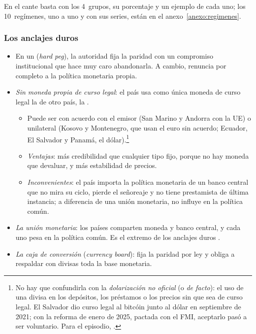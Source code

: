\documentclass[11pt]{article}
\begin{document}
\begin{notaopositor}
En el cante basta con los 4~grupos, su porcentaje y un ejemplo de cada uno; los 10~regímenes, uno a uno y con sus series, están en el anexo~\ref{anexo:regimenes}.
\end{notaopositor}

\subsubsection{Los anclajes duros}\label{sec:anclajes-duros}

\begin{itemize}
\item En un  (\emph{hard peg}), la autoridad fija la paridad con un compromiso institucional que hace muy caro abandonarla. A cambio, renuncia por completo a la política monetaria propia.
\item \emph{Sin moneda propia de curso legal}: el país usa como única moneda de curso legal la de otro país, la .
  \begin{itemize}
  \item Puede ser con acuerdo con el emisor (San Marino y Andorra con la UE) o unilateral (Kosovo y Montenegro, que usan el euro sin acuerdo; Ecuador, El Salvador y Panamá, el dólar).\footnote{No hay que confundirla con la \emph{dolarización no oficial} (o \emph{de facto}): el uso de una divisa en los depósitos, los préstamos o los precios sin que sea de curso legal. El Salvador dio curso legal al bitcóin junto al dólar en septiembre de 2021; con la reforma de enero de 2025, pactada con el FMI, aceptarlo pasó a ser voluntario\nocite{FMI2024ElSalvadorSLA,FMI2025ElSalvador}. Para el episodio, \textcite{Funcas2022ODF77}.}
  \item \emph{Ventajas}: más credibilidad que cualquier tipo fijo, porque no hay moneda que devaluar, y más estabilidad de precios.
  \item \emph{Inconvenientes}: el país importa la política monetaria de un banco central que no mira su ciclo, pierde el señoreaje y no tiene prestamista de última instancia; a diferencia de una unión monetaria, no influye en la política común.
  \end{itemize}
\item \emph{La unión monetaria}: los países comparten moneda y banco central, y cada uno pesa en la política común. Es el extremo de los anclajes duros .
\item \emph{La caja de conversión} (\emph{currency board}): fija la paridad por ley y obliga a respaldar con divisas toda la base monetaria.

\end{itemize}
\end{document}
